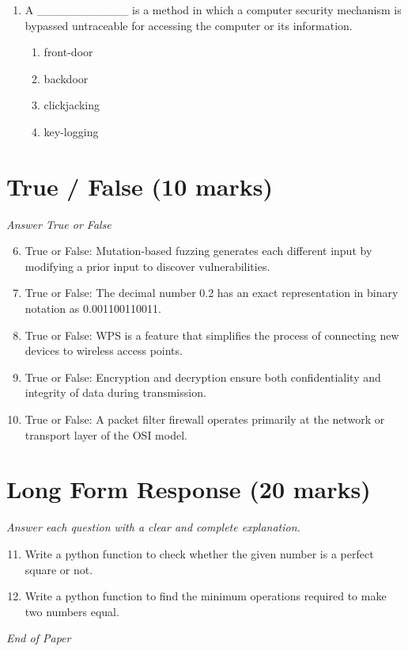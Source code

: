 \documentclass[12pt]{article}
\begin{document}
\begin{enumerate}[label=\arabic*.]
\begin{enumerate}[label=(\alph*)]
    \item No, I cannot compute the key.
    \item Yes, the key is k = m xor c.
    \item I can only compute half the bits of the key.
    \item Yes, the key is k = m xor m.
\end{enumerate}
\item A \_\_\_\_\_\_\_\_\_\_\_ is a method in which a computer security mechanism is bypassed untraceable for accessing the computer or its information.
\begin{enumerate}[label=(\alph*)]
    \item front-door
    \item backdoor
    \item clickjacking
    \item key-logging
\end{enumerate}
\end{enumerate}

\section*{True / False (10 marks)}
\textit{Answer True or False}
\begin{enumerate}[label=\arabic*.]
\setcounter{enumi}{5}
\item True or False: Mutation-based fuzzing generates each different input by modifying a prior input to discover vulnerabilities.
\item True or False: The decimal number 0.2 has an exact representation in binary notation as 0.001100110011.
\item True or False: WPS is a feature that simplifies the process of connecting new devices to wireless access points.
\item True or False: Encryption and decryption ensure both confidentiality and integrity of data during transmission.
\item True or False: A packet filter firewall operates primarily at the network or transport layer of the OSI model.
\end{enumerate}

\section*{Long Form Response (20 marks)}
\textit{Answer each question with a clear and complete explanation.}
\begin{enumerate}[label=\arabic*.]
\setcounter{enumi}{10}
\item Write a python function to check whether the given number is a perfect square or not.
\item Write a python function to find the minimum operations required to make two numbers equal.
\end{enumerate}

\vfill
\noindent\textit{End of Paper}
\end{document}
